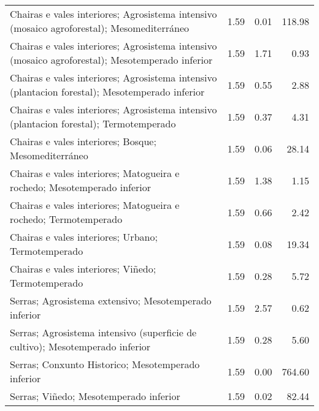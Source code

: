 \begin{table}[p]
\begin{tabular}{lrrr}
  Chairas e vales interiores; Agrosistema intensivo (mosaico agroforestal); Mesomediterráneo & 1.59 & 0.01 & 118.98 \\ 
  Chairas e vales interiores; Agrosistema intensivo (mosaico agroforestal); Mesotemperado inferior & 1.59 & 1.71 & 0.93 \\ 
  Chairas e vales interiores; Agrosistema intensivo (plantacion forestal); Mesotemperado inferior & 1.59 & 0.55 & 2.88 \\ 
  Chairas e vales interiores; Agrosistema intensivo (plantacion forestal); Termotemperado & 1.59 & 0.37 & 4.31 \\ 
  Chairas e vales interiores; Bosque; Mesomediterráneo & 1.59 & 0.06 & 28.14 \\ 
  Chairas e vales interiores; Matogueira e rochedo; Mesotemperado inferior & 1.59 & 1.38 & 1.15 \\ 
  Chairas e vales interiores; Matogueira e rochedo; Termotemperado & 1.59 & 0.66 & 2.42 \\ 
  Chairas e vales interiores; Urbano; Termotemperado & 1.59 & 0.08 & 19.34 \\ 
  Chairas e vales interiores; Viñedo; Termotemperado & 1.59 & 0.28 & 5.72 \\ 
  Serras; Agrosistema extensivo; Mesotemperado inferior & 1.59 & 2.57 & 0.62 \\ 
  Serras; Agrosistema intensivo (superficie de cultivo); Mesotemperado inferior & 1.59 & 0.28 & 5.60 \\ 
  Serras; Conxunto Historico; Mesotemperado inferior & 1.59 & 0.00 & 764.60 \\ 
  Serras; Viñedo; Mesotemperado inferior & 1.59 & 0.02 & 82.44 \\ 
   \hline
\end{tabular}
\end{table}
